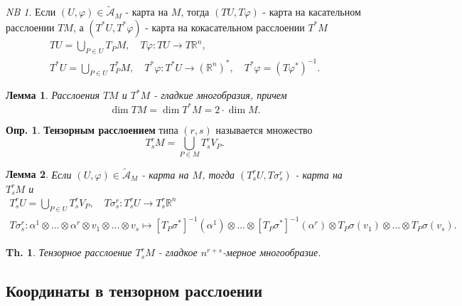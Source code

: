 \documentclass[12pt]{article}
\theoremstyle{plain}
\newtheorem{theorem}{Th.}[section]
\theoremstyle{lemma}
\newtheorem{lemma}{Лемма}
\theoremstyle{corollary}
\theoremstyle{proposition}
\theoremstyle{exercise}
\theoremstyle{example}
\theoremstyle{remark}
\newtheorem{remark}{NB}
\theoremstyle{definition}
\newtheorem{definition}{Опр.}
\newcommand\mb{\mathbb}
\newcommand\tld{\widetilde}
\begin{document}
\begin{remark}
    Если $(U,\varphi) \in \tld{\mathcal{A}}_M$ - карта на $M$, 
    тогда $(TU, T\varphi)$ - карта на касательном расслоении $TM$, а 
    $(T^\ast U, T^\ast \varphi)$ - карта на кокасательном расслоении $T^\ast M$
    \begin{gather*}
        TU = \bigcup_{P\in U} T_PM, \quad 
        T\varphi: TU \to T\mb R^n, \\
        T^\ast U = \bigcup_{P\in U} T^\ast_PM, \quad
        T^\ast \varphi: T^\ast U \to (\mb R^n)^\ast ,\quad 
        T^\ast \varphi = (T \varphi^\ast)^{-1}.
    \end{gather*}
\end{remark}

\begin{lemma}
    Расслоения $TM$ и $T^\ast M$ - гладкие многобразия, причем 
    \begin{equation*}
        \dim TM = \dim T^\ast M = 2 \cdot \dim M.
    \end{equation*}
\end{lemma}

\begin{definition}
    \textbf{Тензорным расслоением} типа $(r,s)$ называется множество 
    \begin{equation*}
        T^r_sM = \bigcup_{P\in M} T^r_s V_P.
    \end{equation*}
\end{definition}

\begin{lemma}
    Если $(U,\varphi) \in \tld{\mathcal{A}}_M$ - карта на $M$, тогда 
    $(T^r_s U, T\sigma^r_s)$ - карта на $T^r_sM$ и 
    \begin{gather*}
        T^r_sU = \bigcup_{P \in U} T^r_s V_P, \quad 
        T\sigma^r_s: T^r_sU \to T^r_s\mb R^n \\ 
        T\sigma^r_s: \alpha^1 \otimes \ldots \otimes \alpha^r \otimes v_1 \otimes \ldots \otimes v_s \mapsto 
        [T_P\sigma^\ast]^{-1} (\alpha^1) \otimes \ldots \otimes [T_P\sigma^\ast]^{-1} (\alpha^r) \otimes 
        T_P\sigma (v_1) \otimes \ldots \otimes T_P\sigma (v_s).
    \end{gather*}
\end{lemma}

\begin{theorem}
    Тензорное расслоение $T^r_s M$ - гладкое $n^{r+s}$-мерное многообразие.
\end{theorem}

\subsection{Координаты в тензорном расслоении}
\end{document}
